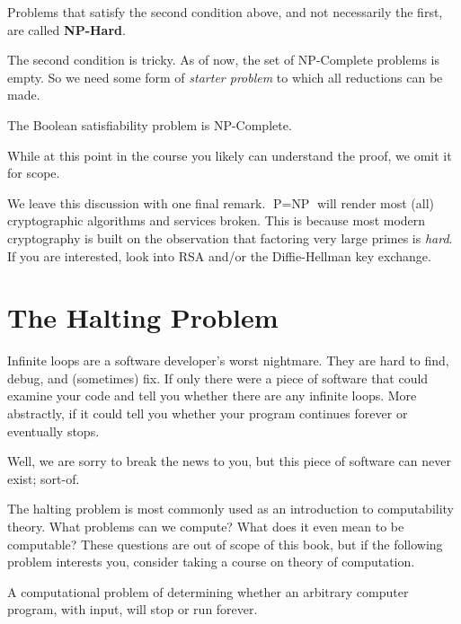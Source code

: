 \documentclass[main.tex]{subfiles}
\begin{document}
\begin{rem}
	Problems that satisfy the second condition above, and not necessarily the first, are called \textbf{NP-Hard}.
\end{rem}

The second condition is tricky.
As of now, the set of NP-Complete problems is empty.
So we need some form of \textit{starter problem} to which all reductions can be made.

\begin{thm}
	The Boolean satisfiability problem is NP-Complete.
\end{thm}

\begin{rem}
	While at this point in the course you likely can understand the proof, we omit it for scope.
\end{rem}

We leave this discussion with one final remark.
\(\text{P}=\text{NP}\) will render most (all) cryptographic algorithms and services broken.
This is because most modern cryptography is built on the observation that factoring very large primes is \textit{hard}.
If you are interested, look into RSA and/or the Diffie-Hellman key exchange.

\section{The Halting Problem}

Infinite loops are a software developer's worst nightmare. They are hard to find, debug, and (sometimes) fix. If only there were a piece of software that could examine your code and tell you whether there are any infinite loops. More abstractly, if it could tell you whether your program continues forever or eventually stops.

Well, we are sorry to break the news to you, but this piece of software can never exist; sort-of.

The halting problem is most commonly used as an introduction to computability theory. What problems can we compute? What does it even mean to be computable? These questions are out of scope of this book, but if the following problem interests you, consider taking a course on theory of computation.

\begin{defn}
	A computational problem of determining whether an arbitrary computer program, with input, will stop or run forever.
\end{defn}
\end{document}
